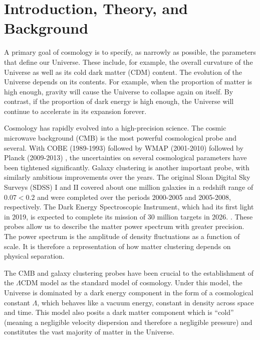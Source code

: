 \chapter{Introduction, Theory, and Background}


A primary goal of cosmology is to specify, as narrowly as possible, the 
parameters that define our Universe. These include, for example, the overall 
curvature of the Universe as well as its cold dark matter (CDM) content. The 
evolution of the Universe depends on its contents. For example, when the 
proportion of matter is high enough,
gravity will cause the Universe to collapse again on itself. By contrast, if
the proportion of dark energy is high enough, the Universe will continue to
accelerate in its expansion forever.

Cosmology has rapidly evolved into a high-precision science. The cosmic
microwave background (CMB) is the most powerful cosmological probe and
several. With
COBE (1989-1993)  followed by WMAP (2001-2010)  followed 
by Planck (2009-2013) , the uncertainties on several cosmological 
parameters have been tightened significantly.
Galaxy clustering is another important probe, with similarly ambitious
improvements over the years. The original Sloan Digital Sky Surveys (SDSS) I
and II covered about one million galaxies in a redshift range of $0.07 < 0.2$
and were completed over the periods 2000-2005 and 2005-2008, respectively.
The Dark Energy Spectroscopic Instrument, which had its first light in 2019, is expected to complete its mission of 30 million targets in 2026.
. These probes allow us to describe the matter power spectrum
with greater precision. The power spectrum is the amplitude of density
fluctuations as a function of scale. It is therefore a representation of how
matter clustering depends on physical separation.

The CMB and galaxy clustering probes have been crucial to the establishment
of the $\Lambda$CDM model as the standard model of cosmology. Under this
model, the Universe is dominated by a dark energy component in the form of a
cosmological constant $\Lambda$, which behaves like a vacuum energy, constant
in density across space and time. This model also posits a dark matter
component which is ``cold'' (meaning a negligible velocity dispersion and
therefore a negligible pressure) and constitutes the vast majority of matter
in the Universe.

